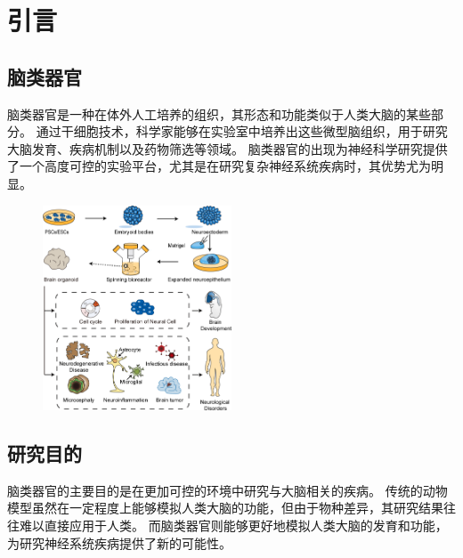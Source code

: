 \chapter{引言}\label{chap:introduction}

\section{脑类器官}\label{sec:brain-organoid}
脑类器官是一种在体外人工培养的组织，其形态和功能类似于人类大脑的某些部分\cite{Kim2023}。
通过干细胞技术，科学家能够在实验室中培养出这些微型脑组织，用于研究大脑发育、疾病机制以及药物筛选等领域。
脑类器官的出现为神经科学研究提供了一个高度可控的实验平台，尤其是在研究复杂神经系统疾病时，其优势尤为明显。

\begin{figure}[!htbp]
    \centering
    \includegraphics[width=0.50\textwidth]{Img/brain-organoid-flow.png}
    \label{fig:brain-organoid-flow}
\end{figure}

\section{研究目的}\label{sec:research-purpose}
脑类器官的主要目的是在更加可控的环境中研究与大脑相关的疾病。
传统的动物模型虽然在一定程度上能够模拟人类大脑的功能，但由于物种差异，其研究结果往往难以直接应用于人类。
而脑类器官则能够更好地模拟人类大脑的发育和功能，为研究神经系统疾病提供了新的可能性。


